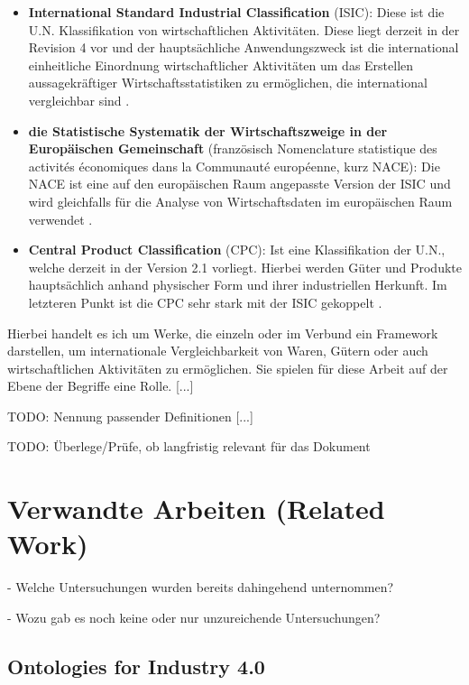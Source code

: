\documentclass{article}
\begin{document}
\begin{itemize}
    \item \textbf{International Standard Industrial Classification} (ISIC): Diese ist die U.N. Klassifikation von wirtschaftlichen Aktivitäten. Diese liegt derzeit in der Revision 4 vor und der hauptsächliche Anwendungszweck ist die international einheitliche Einordnung wirtschaftlicher Aktivitäten um das Erstellen aussagekräftiger Wirtschaftsstatistiken zu ermöglichen, die international vergleichbar sind \cite{UNSDISIC}.
    \item \textbf{die Statistische Systematik der Wirtschaftszweige in der Europäischen Gemeinschaft} (französisch Nomenclature statistique des activités économiques dans la Communauté européenne, kurz NACE): Die NACE ist eine auf den europäischen Raum angepasste Version der ISIC und wird gleichfalls für die Analyse von Wirtschaftsdaten im europäischen Raum verwendet \cite{EurostatNACE}.
    \item \textbf{Central Product Classification} (CPC): Ist eine Klassifikation der U.N., welche derzeit in der Version 2.1 vorliegt. Hierbei werden Güter und Produkte hauptsächlich anhand physischer Form und ihrer industriellen Herkunft. Im letzteren Punkt ist die CPC sehr stark mit der ISIC gekoppelt \cite{UNSDCPCv21}.
\end{itemize}

Hierbei handelt es ich um Werke, die einzeln oder im Verbund ein Framework darstellen, um internationale Vergleichbarkeit von Waren, Gütern oder auch wirtschaftlichen Aktivitäten zu ermöglichen. Sie spielen für diese Arbeit auf der Ebene der Begriffe eine Rolle. [...]

TODO: Nennung passender Definitionen [...]

TODO: Überlege/Prüfe, ob langfristig relevant für das Dokument

\section{Verwandte Arbeiten (Related Work)}

- Welche Untersuchungen wurden bereits dahingehend unternommen?

- Wozu gab es noch keine oder nur unzureichende Untersuchungen?

\subsection{Ontologies for Industry 4.0}
%
\end{document}
